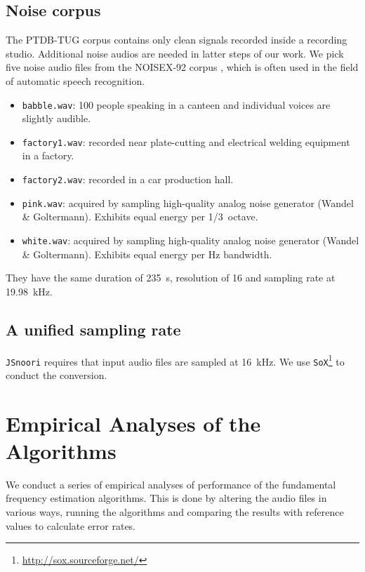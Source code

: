 \documentclass[11pt,a4paper]{report}
\begin{document}
\section{Noise corpus}

The PTDB-TUG corpus contains only clean signals recorded inside a recording studio.
Additional noise audios are needed in latter steps of our work.
We pick five noise audio files from the NOISEX-92 corpus \parencite{varga1993assessment}, which is often used in the field of automatic speech recognition.

\begin{itemize}
  \item \texttt{babble.wav}: 100 people speaking in a canteen and individual voices are slightly audible.
  \item \texttt{factory1.wav}: recorded near plate-cutting and electrical welding equipment in a factory.
  \item \texttt{factory2.wav}: recorded in a car production hall.
  \item \texttt{pink.wav}: acquired by sampling high-quality analog noise generator (Wandel \& Goltermann).
    Exhibits equal energy per \SI{1/3}{octave}.
  \item \texttt{white.wav}: acquired by sampling high-quality analog noise generator (Wandel \& Goltermann).
    Exhibits equal energy per \si{\hertz} bandwidth.
\end{itemize}

They have the same duration of \SI{235}{\second}, resolution of \SI{16}{\bit} and sampling rate at \SI{19.98}{\kilo\hertz}.

\section{A unified sampling rate}

\texttt{JSnoori} requires that input audio files are sampled at \SI{16}{\kilo\hertz}.
We use \texttt{SoX}\footnote{\url{http://sox.sourceforge.net/}} to conduct the conversion.

\chapter{Empirical Analyses of the Algorithms} \label{emp-aly}

We conduct a series of empirical analyses of performance of the fundamental frequency estimation algorithms.
This is done by altering the audio files in various ways, running the algorithms and comparing the results with reference values to calculate error rates.
\end{document}
